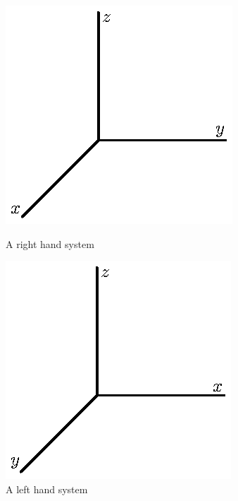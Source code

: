 \begin{figure}[ht]
\begin{center}
\begin{minipage}{2.5in}
\begin{center}
  \includegraphics{figures/fig_9_1_right_hand.eps}
\caption{A right hand system}
\label{F:9.1.right_hand}
\end{center}
\end{minipage}
\hspace{0.5in}
\begin{minipage}{2.5in}
\begin{center}
  \includegraphics{figures/fig_9_1_left_hand.eps}
\caption{A left hand system}
\label{F:9.1.left_hand}
\end{center}
\end{minipage}
\end{center}
\end{figure}

